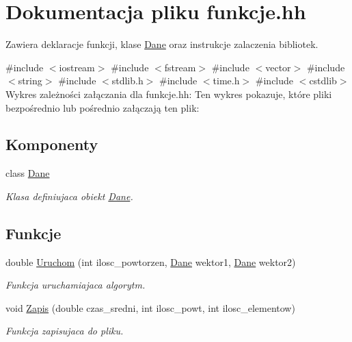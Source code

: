\hypertarget{funkcje_8hh}{\section{\-Dokumentacja pliku funkcje.\-hh}
\label{funkcje_8hh}
}


\-Zawiera deklaracje funkcji, klase \hyperlink{class_dane}{\-Dane} oraz instrukcje zalaczenia bibliotek.  


{\ttfamily \#include $<$iostream$>$}\*
{\ttfamily \#include $<$fstream$>$}\*
{\ttfamily \#include $<$vector$>$}\*
{\ttfamily \#include $<$string$>$}\*
{\ttfamily \#include $<$stdlib.\-h$>$}\*
{\ttfamily \#include $<$time.\-h$>$}\*
{\ttfamily \#include $<$cstdlib$>$}\*
\-Wykres zależności załączania dla funkcje.\-hh\-:
\-Ten wykres pokazuje, które pliki bezpośrednio lub pośrednio załączają ten plik\-:
\subsection*{\-Komponenty}
\begin{DoxyCompactItemize}
\item 
class \hyperlink{class_dane}{\-Dane}
\begin{DoxyCompactList}\small\item\em \-Klasa definiujaca obiekt \hyperlink{class_dane}{\-Dane}. \end{DoxyCompactList}\end{DoxyCompactItemize}
\subsection*{\-Funkcje}
\begin{DoxyCompactItemize}
\item 
double \hyperlink{funkcje_8hh_ac1e549037ac5915fb1018a206697594d}{\-Uruchom} (int ilosc\-\_\-powtorzen, \hyperlink{class_dane}{\-Dane} wektor1, \hyperlink{class_dane}{\-Dane} wektor2)
\begin{DoxyCompactList}\small\item\em \-Funkcja uruchamiajaca algorytm. \end{DoxyCompactList}\item 
void \hyperlink{funkcje_8hh_a26b47c1c0a853ec6e39c299da7eff8b3}{\-Zapis} (double czas\-\_\-sredni, int ilosc\-\_\-powt, int ilosc\-\_\-elementow)
\begin{DoxyCompactList}\small\item\em \-Funkcja zapisujaca do pliku. \end{DoxyCompactList}\end{DoxyCompactItemize}


